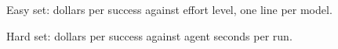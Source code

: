 \begin{figure}[H]
\centering

\caption{Easy set: dollars per success against effort level, one line per model.}
\label{fig:effort-cost}
\end{figure}

\begin{figure}[H]
\centering

\caption{Hard set: dollars per success against agent seconds per run.}
\label{fig:hard-cost-time}
\end{figure}
